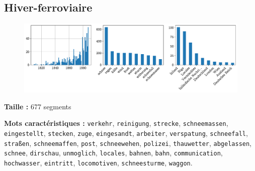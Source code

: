 \documentclass[a4paper,twoside,12pt]{article}
\begin{document}
\clearpage


\subsection*{Hiver-ferroviaire} \label{topic8_hiver-ferroviaire}

\begin{figure}[H]
\centering
\includegraphics[width=\textwidth]{images/topic_charts_8.pdf}
\end{figure}

\begin{flushleft}
\textbf{Taille :} 677 segments

\textbf{Mots caractéristiques :} \texttt{verkehr}, \texttt{reinigung}, \texttt{strecke}, \texttt{schneemassen}, \texttt{eingestellt}, \texttt{stecken}, \texttt{zuge}, \texttt{eingesandt}, \texttt{arbeiter}, \texttt{verspatung}, \texttt{schneefall}, \texttt{straßen}, \texttt{schneemaffen}, \texttt{post}, \texttt{schneewehen}, \texttt{polizei}, \texttt{thauwetter}, \texttt{abgelassen}, \texttt{schnee}, \texttt{dirschau}, \texttt{unmoglich}, \texttt{locales}, \texttt{bahnen}, \texttt{bahn}, \texttt{communication}, \texttt{hochwasser}, \texttt{eintritt}, \texttt{locomotiven}, \texttt{schneesturme}, \texttt{waggon}.
\end{flushleft}

\medskip
\end{document}
